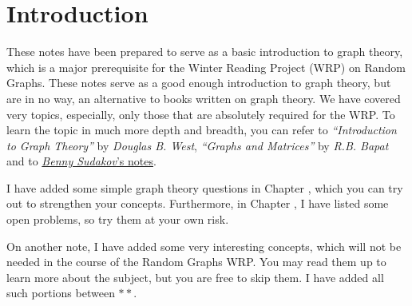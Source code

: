 \documentclass[../basic_graph_theory.tex]{subfiles}
\begin{document}
\chapter{Introduction}
\setcounter{chapter}{0} %
\setcounter{section}{0}
\setcounter{equation}{0}
\setcounter{figure}{0}

These notes have been prepared to serve as a basic introduction to graph theory, which is a major prerequisite for the Winter Reading Project (WRP) on Random Graphs. These notes serve as a good enough introduction to graph theory, but are in no way, an alternative to books written on graph theory. We have covered very topics, especially, only those that are absolutely required for the WRP. To learn the topic in much more depth and breadth, you can refer to \textit{``Introduction to Graph Theory''} by \textit{Douglas B. West}, \textit{``Graphs and Matrices''} by \textit{R.B. Bapat} and to \href{https://www2.math.ethz.ch/education/bachelor/lectures/fs2016/math/graph_theory/graph_theory_notes.pdf}{\textit{Benny Sudakov}'s notes}.

I have added some simple graph theory questions in Chapter , which you can try out to strengthen your concepts. Furthermore, in Chapter , I have listed some open problems, so try them at your own risk.

On another note, I have added some very interesting concepts, which will not be needed in the course of the Random Graphs WRP. You may read them up to learn more about the subject, but you are free to skip them. I have added all such portions between $**$.
\end{document}
